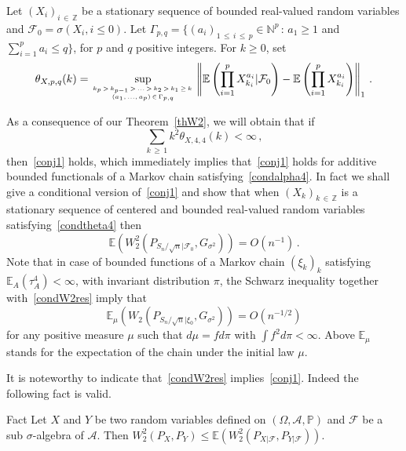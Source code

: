 \documentclass[AHL,Unicode,longabstracts,published]{cedram}
\newcommand{\bbE}{\mathbb{E}}
\newcommand{\bbZ}{\mathbb{Z}}
\newcommand{\bbN}{\mathbb{N}}
\newcommand{\clF}{\mathcal{F}}
\newcommand{\clA}{\mathcal{A}}
\newcommand{\bbP}{\mathbb{P}}
\begin{document}
\begin{defi} \label{deftheta}
Let $(X_i)_{i\,\in\,\bbZ}$ be a stationary sequence of bounded real-valued random variables and $\clF_0 = \sigma (X_i, i \leq 0)$. Let
$ \Gamma_{p,q} = \{ (a_i)_{1\,\leq\,i \,\leq\,p} \in \bbN^p \, : \, a_1 \geq 1$ and  $\sum_{i=1}^p a_i \leq q \} $, for $p$ and $q$ positive integers. For $k\geq 0$, set
\[
\theta_{X,p,q} (k) = \sup_{ k_p\,>\,k_{p-1}\,>\,\ldots\,>\,k_2\,>\,k_1\,\geq\,k\,\atop (a_1,\,\dots,\,a_p)\,\in\,\Gamma_{p,q}} \left \Vert \bbE \left(\prod_{i=1}^p X_{k_i}^{a_i} | {\clF_0 } \right) - \bbE \left (\prod_{i=1}^p X_{k_i}^{a_i} \right) \right\Vert_1 \,.
\]
\end{defi}
As a consequence of our Theorem~\ref{thW2}, we will obtain that if
\begin{equation}\label{condtheta4}
\sum_{k\,\geq\,1} k^2 \theta_{X,4,4} (k) < \infty \,,
\end{equation}
then~\eqref{conj1} holds, which immediately implies that~\eqref{conj1} holds for additive bounded functionals of a Markov chain satisfying~\eqref{condalpha4}. In fact we shall give a conditional version of~\eqref{conj1} and show that when $(X_k)_{k\,\in\,\bbZ}$ is a stationary sequence of centered and bounded real-valued random variables satisfying~\eqref{condtheta4} then
\begin{equation}\label{condW2res}
\bbE \left(W_2^2 \left(P_{S_n / {\sqrt n} |\clF_0 }, G_{\sigma^2}\right) \right) = O (n^{-1}) \,.
\end{equation}
Note that in case of bounded functions of a Markov chain $(\xi_k)_k$ satisfying $\bbE_A (\tau_A^4) < \infty$, with invariant distribution $\pi$, the Schwarz inequality together with~\eqref{condW2res} imply that
\[
\bbE_\mu \left(W_2 \left(P_{S_n / {\sqrt n} |{\xi}_0 }, G_{\sigma^2}\right) \right) = O (n^{-1/2})
\]
for any positive measure $\mu$ such that $d \mu = f d \pi $ with $\int f^2 d \pi < \infty$. Above $ \bbE_\mu$ stands for the expectation of the chain under the initial law $\mu$.


It is noteworthy to indicate that~\eqref{condW2res} implies~\eqref{conj1}. Indeed the following fact is valid.


\begin{enonce}
{Fact}\label{CompQCCondQC}
Let $X$ and $Y$ be two random variables defined on $(\Omega,\clA, \bbP)$ and $\clF$ be a sub $\sigma$-algebra of $\clA$. Then $W_2^2 (P_{X }, P_{Y }) \leq \bbE (W_2^2 (P_{X | \clF}, P_{Y | \clF}))$.
\end{enonce}
\end{document}
